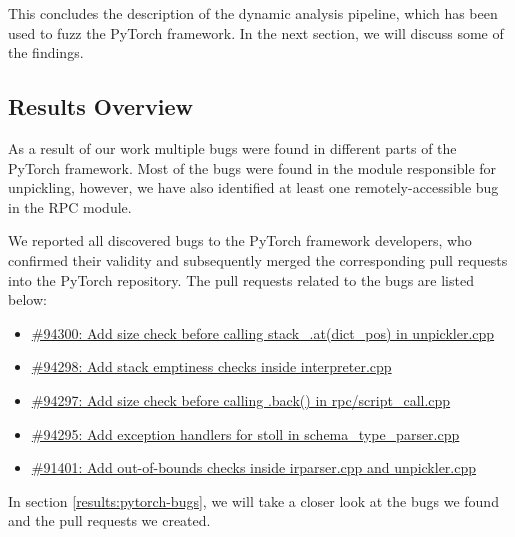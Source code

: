 This concludes the description of the dynamic analysis pipeline, which has been used to fuzz the PyTorch framework. In the next section, we will discuss some of the findings.

\subsection{Results Overview}

As a result of our work multiple bugs were found in different parts of the PyTorch framework. Most of the bugs were found in the module responsible for unpickling, however, we have also identified at least one remotely-accessible bug in the RPC module.

We reported all discovered bugs to the PyTorch framework developers, who confirmed their validity and subsequently merged the corresponding pull requests into the PyTorch repository. The pull requests related to the bugs are listed below:

\begin{itemize}
    \item \href{https://github.com/pytorch/pytorch/pull/94300}{\#94300: Add size check before calling stack\_.at(dict\_pos) in unpickler.cpp}
    \item \href{https://github.com/pytorch/pytorch/pull/94298}{\#94298: Add stack emptiness checks inside interpreter.cpp}
    \item \href{https://github.com/pytorch/pytorch/pull/94297}{\#94297: Add size check before calling .back() in rpc/script\_call.cpp}
    \item \href{https://github.com/pytorch/pytorch/pull/94295}{\#94295: Add exception handlers for stoll in schema\_type\_parser.cpp}
    \item \href{https://github.com/pytorch/pytorch/pull/91401}{\#91401: Add out-of-bounds checks inside irparser.cpp and unpickler.cpp}
\end{itemize}

In section \ref{results:pytorch-bugs}, we will take a closer look at the bugs we found and the pull requests we created.
